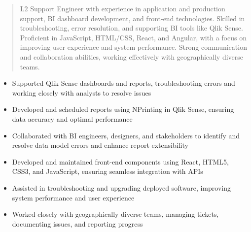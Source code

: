 



\makecvheader

\begin{quote}
  \noindent
  L2 Support Engineer with experience in application and production support, BI dashboard development, and front-end technologies. Skilled in troubleshooting, error resolution, and supporting BI tools like Qlik Sense. Proficient in JavaScript, HTML/CSS, React, and Angular, with a focus on improving user experience and system performance. Strong communication and collaboration abilities, working effectively with geographically diverse teams.
\end{quote}

\par\smallskip
\noindent
\begin{minipage}{20cm}
  \begin{minipage}{9.75cm}
    \begin{itemize}
      \item Supported Qlik Sense dashboards and reports, troubleshooting errors and working closely with analysts to resolve issues
      \item Developed and scheduled reports using NPrinting in Qlik Sense, ensuring data accuracy and optimal performance
      \item Collaborated with BI engineers, designers, and stakeholders to identify and resolve data model errors and enhance report extensibility
    \end{itemize}
  \end{minipage}
  \hfill
  \begin{minipage}{9.75cm}
    \begin{itemize}
      \item Developed and maintained front-end components using React, HTML5, CSS3, and JavaScript, ensuring seamless integration with APIs
      \item Assisted in troubleshooting and upgrading deployed software, improving system performance and user experience
      \item Worked closely with geographically diverse teams, managing tickets, documenting issues, and reporting progress
    \end{itemize}
  \end{minipage}
\end{minipage}
\par\smallskip
\divider

